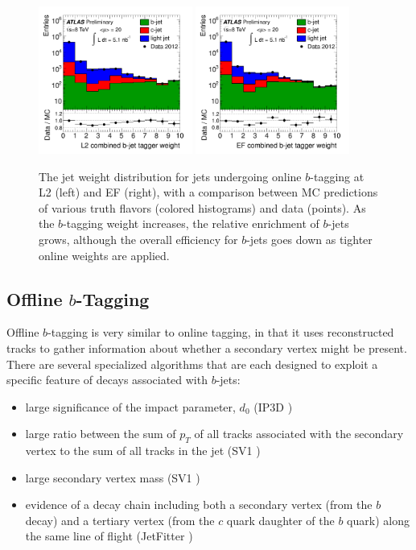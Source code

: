 \begin{figure}
	\includegraphics[width=0.45\textwidth]{ReconstructionPerformance/online_btag_L2.pdf}
	\includegraphics[width=0.45\textwidth]{ReconstructionPerformance/online_btag_EF.pdf}
	\caption{The jet weight distribution for jets undergoing online $b$-tagging at L2 (left) and EF (right),
        with a comparison between MC predictions of various truth flavors (colored histograms) and data (points).
        As the $b$-tagging weight increases, the relative enrichment of $b$-jets grows, although the overall
        efficiency for $b$-jets goes down as tighter online weights are applied. \cite{online_btag}	\label{fig:online_btag}  }
\end{figure}




\subsection{Offline $b$-Tagging}
Offline $b$-tagging is very similar to online tagging, in that it uses reconstructed tracks to gather
information about whether a secondary vertex might be present.  There are several specialized algorithms
that are each designed to exploit a specific feature of decays associated with $b$-jets:

\begin{itemize}
	\item large significance of the impact parameter, $d_0$ (IP3D \cite{ip3d})
	\item large ratio between the sum of $p_T$ of all tracks associated with the secondary vertex to the sum of all tracks in the jet (SV1 \cite{ip3d})
	\item large secondary vertex mass (SV1 \cite{ip3d})
	\item evidence of a decay chain including both a secondary vertex (from the $b$ decay) and a tertiary vertex (from the $c$ quark daughter of the $b$ quark) along the same line of flight (JetFitter \cite{jet_fitter}) 
\end{itemize}

